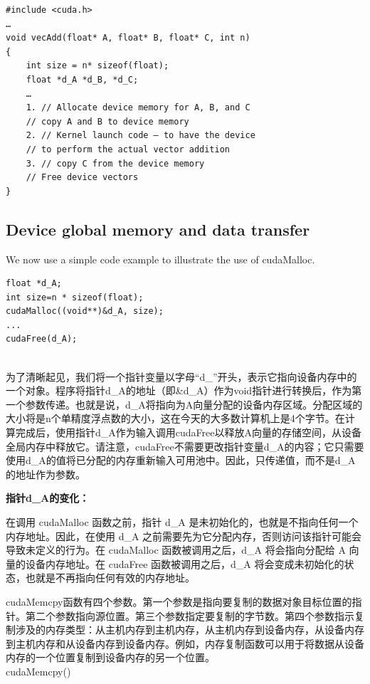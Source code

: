 \documentclass[11pt]{ctexart}
\begin{document}
\begin{lstlisting}
#include <cuda.h>
…
void vecAdd(float* A, float* B, float* C, int n)
{
	int size = n* sizeof(float);
	float *d_A *d_B, *d_C;
	…
	1. // Allocate device memory for A, B, and C
	// copy A and B to device memory
	2. // Kernel launch code – to have the device
	// to perform the actual vector addition
	3. // copy C from the device memory
	// Free device vectors
}	
\end{lstlisting}


\subsection{Device global memory and data transfer}

We now use a simple code example to illustrate the use of cudaMalloc.

\begin{lstlisting}
float *d_A;
int size=n * sizeof(float);
cudaMalloc((void**)&d_A, size);
...
cudaFree(d_A);
	
\end{lstlisting}

为了清晰起见，我们将一个指针变量以字母“d\_”开头，表示它指向设备内存中的一个对象。程序将指针d\_A的地址（即\&d\_A）作为void指针进行转换后，作为第一个参数传递。也就是说，d\_A将指向为A向量分配的设备内存区域。分配区域的大小将是n个单精度浮点数的大小，这在今天的大多数计算机上是4个字节。在计算完成后，使用指针d\_A作为输入调用cudaFree以释放A向量的存储空间，从设备全局内存中释放它。请注意，cudaFree不需要更改指针变量d\_A的内容；它只需要使用d\_A的值将已分配的内存重新输入可用池中。因此，只传递值，而不是d\_A的地址作为参数。

\textbf{指针d\_A的变化：}

在调用 cudaMalloc 函数之前，指针 d\_A 是未初始化的，也就是不指向任何一个内存地址。因此，在使用 d\_A 之前需要先为它分配内存，否则访问该指针可能会导致未定义的行为。在 cudaMalloc 函数被调用之后，d\_A 将会指向分配给 A 向量的设备内存地址。在 cudaFree 函数被调用之后，d\_A 将会变成未初始化的状态，也就是不再指向任何有效的内存地址。

cudaMemcpy函数有四个参数。第一个参数是指向要复制的数据对象目标位置的指针。第二个参数指向源位置。第三个参数指定要复制的字节数。第四个参数指示复制涉及的内存类型：从主机内存到主机内存，从主机内存到设备内存，从设备内存到主机内存和从设备内存到设备内存。例如，内存复制函数可以用于将数据从设备内存的一个位置复制到设备内存的另一个位置。\\

cudaMemcpy()
\end{document}
